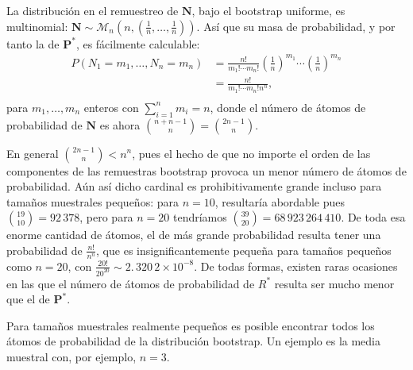 \documentclass[
]{book}
\renewcommand{\mathbf}[1]{\symbf{#1}}
\theoremstyle{break}
\theoremstyle{nonumberplain}
\begin{document}
La distribución en el remuestreo de \(\mathbf{N}\), bajo el
bootstrap uniforme, es multinomial: \(\mathbf{N}\sim \mathcal{M}_n\left(
n,\left( \frac{1}{n},\ldots ,\frac{1}{n} \right) \right)\). Así que su
masa de probabilidad, y por tanto la de \(\mathbf{P}^{\ast}\), es
fácilmente calculable:
\[\begin{aligned}
P\left( N_1=m_1,\ldots ,N_n=m_n \right) &= \frac{n!}{m_1!\cdots
m_n!}\left( \frac{1}{n} \right)^{m_1}\cdots \left( \frac{1}{n} \right)
^{m_n} \\
&= \frac{n!}{m_1!\cdots m_n!n^{n}}\text{, } \\
\end{aligned}\]
para \(m_1,\ldots ,m_n\) enteros con \(\sum_{i=1}^{n}m_i = n\),
donde el número de átomos de probabilidad de \(\mathbf{N}\) es ahora
\(\binom{n+n-1}{n}=\binom{2n-1}{n}\).

En general \(\binom{2n-1}{n}<n^{n}\),
pues el hecho de que no importe el orden de las componentes de las
remuestras bootstrap provoca un menor número de átomos de probabilidad.
Aún así dicho cardinal es prohibitivamente grande incluso para tamaños
muestrales pequeños: para \(n=10\), resultaría abordable pues
\(\binom{19}{10}= 92\,378\), pero para \(n=20\) tendríamos
\(\binom{39}{20}= 68\, 923\,264\,410\). De toda esa
enorme cantidad de átomos, el de más grande probabilidad resulta tener
una probabilidad de \(\frac{n!}{n^{n}}\), que es insignificantemente
pequeña para tamaños pequeños como \(n=20\), con
\(\frac{20!}{20^{20}}\sim 2.\, 320\,2\times 10^{-8}\). De todas
formas, existen raras ocasiones en las que el número de átomos de
probabilidad de \(R^{\ast}\) resulta ser mucho menor que el de
\(\mathbf{P}^{\ast}\).

Para tamaños muestrales realmente pequeños es posible encontrar todos
los átomos de probabilidad de la distribución bootstrap. Un ejemplo es
la media muestral con, por ejemplo, \(n=3\).
\end{document}
